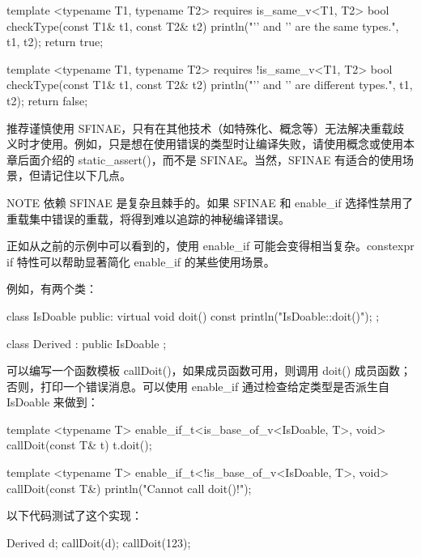 \begin{cpp}
template <typename T1, typename T2> requires is_same_v<T1, T2>
bool checkType(const T1& t1, const T2& t2)
{
    println("'{}' and '{}' are the same types.", t1, t2);
    return true;
}

template <typename T1, typename T2> requires !is_same_v<T1, T2>
bool checkType(const T1& t1, const T2& t2)
{
    println("'{}' and '{}' are different types.", t1, t2);
    return false;
}
\end{cpp}

推荐谨慎使用 SFINAE，只有在其他技术（如特殊化、概念等）无法解决重载歧义时才使用。例如，只是想在使用错误的类型时让编译失败，请使用概念或使用本章后面介绍的 static\_assert()，而不是 SFINAE。当然，SFINAE 有适合的使用场景，但请记住以下几点。

\begin{myNotic}{NOTE}
依赖 SFINAE 是复杂且棘手的。如果 SFINAE 和 enable\_if 选择性禁用了重载集中错误的重载，将得到难以追踪的神秘编译错误。
\end{myNotic}


正如从之前的示例中可以看到的，使用 enable\_if 可能会变得相当复杂。constexpr if 特性可以帮助显著简化 enable\_if 的某些使用场景。

例如，有两个类：

\begin{cpp}
class IsDoable
{
    public:
        virtual void doit() const { println("IsDoable::doit()"); }
};

class Derived : public IsDoable { };
\end{cpp}

可以编写一个函数模板 callDoit()，如果成员函数可用，则调用 doit() 成员函数；否则，打印一个错误消息。可以使用 enable\_if 通过检查给定类型是否派生自 IsDoable 来做到：

\begin{cpp}
template <typename T>
enable_if_t<is_base_of_v<IsDoable, T>, void> callDoit(const T& t)
{
    t.doit();
}

template <typename T>
enable_if_t<!is_base_of_v<IsDoable, T>, void> callDoit(const T&)
{
    println("Cannot call doit()!");
}
\end{cpp}

以下代码测试了这个实现：

\begin{cpp}
Derived d;
callDoit(d);
callDoit(123);
\end{cpp}

